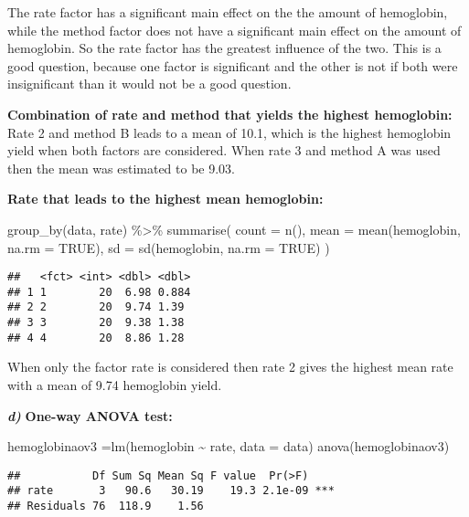 \documentclass[
]{article}
\newenvironment{Shaded}{\begin{snugshade}}{\end{snugshade}}
\newcommand{\AttributeTok}[1]{\textcolor[rgb]{0.77,0.63,0.00}{#1}}
\newcommand{\ConstantTok}[1]{\textcolor[rgb]{0.00,0.00,0.00}{#1}}
\newcommand{\FunctionTok}[1]{\textcolor[rgb]{0.00,0.00,0.00}{#1}}
\newcommand{\NormalTok}[1]{#1}
\newcommand{\OtherTok}[1]{\textcolor[rgb]{0.56,0.35,0.01}{#1}}
\newcommand{\SpecialCharTok}[1]{\textcolor[rgb]{0.00,0.00,0.00}{#1}}
\begin{document}
The rate factor has a significant main effect on the the amount of
hemoglobin, while the method factor does not have a significant main
effect on the amount of hemoglobin. So the rate factor has the greatest
influence of the two. This is a good question, because one factor is
significant and the other is not if both were insignificant than it
would not be a good question.

\textbf{Combination of rate and method that yields the highest
hemoglobin:} Rate 2 and method B leads to a mean of 10.1, which is the
highest hemoglobin yield when both factors are considered. When rate 3
and method A was used then the mean was estimated to be 9.03.

\textbf{Rate that leads to the highest mean hemoglobin:}

\begin{Shaded}
\begin{Highlighting}[]
\FunctionTok{group\_by}\NormalTok{(data, rate) }\SpecialCharTok{\%\textgreater{}\%}
  \FunctionTok{summarise}\NormalTok{(}
    \AttributeTok{count =} \FunctionTok{n}\NormalTok{(),}
    \AttributeTok{mean =} \FunctionTok{mean}\NormalTok{(hemoglobin, }\AttributeTok{na.rm =} \ConstantTok{TRUE}\NormalTok{),}
    \AttributeTok{sd =} \FunctionTok{sd}\NormalTok{(hemoglobin, }\AttributeTok{na.rm =} \ConstantTok{TRUE}\NormalTok{)}
\NormalTok{  )}
\end{Highlighting}
\end{Shaded}

\begin{verbatim}
##   <fct> <int> <dbl> <dbl>
## 1 1        20  6.98 0.884
## 2 2        20  9.74 1.39 
## 3 3        20  9.38 1.38 
## 4 4        20  8.86 1.28
\end{verbatim}

When only the factor rate is considered then rate 2 gives the highest
mean rate with a mean of 9.74 hemoglobin yield.

\textbf{\emph{d)}} \textbf{One-way ANOVA test:}

\begin{Shaded}
\begin{Highlighting}[]
\NormalTok{hemoglobinaov3 }\OtherTok{=}\FunctionTok{lm}\NormalTok{(hemoglobin }\SpecialCharTok{\textasciitilde{}}\NormalTok{ rate, }\AttributeTok{data =}\NormalTok{ data)}
\FunctionTok{anova}\NormalTok{(hemoglobinaov3)}
\end{Highlighting}
\end{Shaded}

\begin{verbatim}
##           Df Sum Sq Mean Sq F value  Pr(>F)    
## rate       3   90.6   30.19    19.3 2.1e-09 ***
## Residuals 76  118.9    1.56                    
\end{verbatim}
\end{document}
